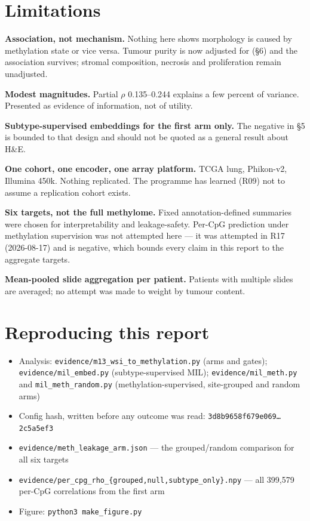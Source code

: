 \documentclass[11pt,a4paper]{article}
\begin{document}
\section{Limitations}

\textbf{Association, not mechanism.} Nothing here shows morphology is caused by methylation state
or vice versa. Tumour purity is now adjusted for (\S6) and the association survives; stromal
composition, necrosis and proliferation remain unadjusted.

\textbf{Modest magnitudes.} Partial $\rho$ 0.135--0.244 explains a few percent of variance.
Presented as evidence of information, not of utility.

\textbf{Subtype-supervised embeddings for the first arm only.} The negative in \S5 is bounded to
that design and should not be quoted as a general result about H\&E.

\textbf{One cohort, one encoder, one array platform.} TCGA lung, Phikon-v2, Illumina 450k.
Nothing replicated. The programme has learned (R09) not to assume a replication cohort exists.

\textbf{Six targets, not the full methylome.} Fixed annotation-defined summaries were chosen for
interpretability and leakage-safety. Per-CpG prediction under methylation supervision was not
attempted here --- \textcolor{qred}{it was attempted in R17 (2026-08-17) and is negative}, which
bounds every claim in this report to the aggregate targets.

\textbf{Mean-pooled slide aggregation per patient.} Patients with multiple slides are averaged;
no attempt was made to weight by tumour content.

\section{Reproducing this report}

\begin{itemize}[leftmargin=1.2em,itemsep=1pt]
\item Analysis: \texttt{evidence/m13\_wsi\_to\_methylation.py} (arms and gates);
      \texttt{evidence/mil\_embed.py} (subtype-supervised MIL);
      \texttt{evidence/mil\_meth.py} and \texttt{mil\_meth\_random.py} (methylation-supervised,
      site-grouped and random arms)
\item Config hash, written before any outcome was read:
      \texttt{3d8b9658f679e069\ldots2c5a5ef3}
\item \texttt{evidence/meth\_leakage\_arm.json} --- the grouped/random comparison for all six
      targets
\item \texttt{evidence/per\_cpg\_rho\_\{grouped,null,subtype\_only\}.npy} --- all 399{,}579
      per-CpG correlations from the first arm
\item Figure: \texttt{python3 make\_figure.py}
\end{itemize}
\end{document}
